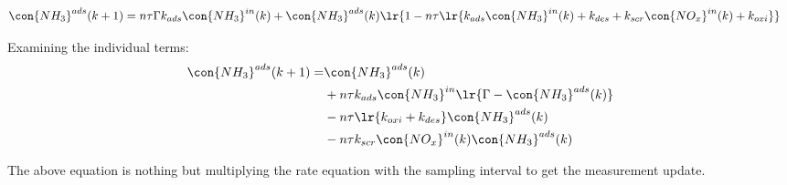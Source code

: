\begin{align}
    \con{NH_3}^{ads}(k + 1) &= n \tau \Gamma k_{ads} \con{NH_3}^{in}(k)  + \con{NH_3}^{ads} (k) \lr{1 - n \tau \lr{k_{ads} \con{NH_3}^{in}(k) + k_{des} + k_{scr} \con{NO_x}^{in}(k) + k_{oxi}}}
\end{align}

Examining the individual terms:
\begin{align*}
    \con{NH_3}^{ads}(k + 1) =& \con{NH_3}^{ads}(k)\\
        &+ n\tau k_{ads} \con{NH_3}^{in} \lr{\Gamma - \con{NH_3}^{ads}(k)} \\
        &- n \tau \lr{k_{oxi} + k_{des}} \con{NH_3}^{ads} (k)\\
        &- n \tau k_{scr} \con{NO_x}^{in}(k) \con{NH_3}^{ads}(k)
\end{align*}

The above equation is nothing but multiplying the rate equation with the
sampling interval to get the measurement update.
